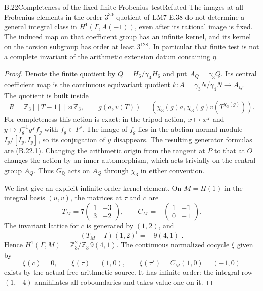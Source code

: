 \begin{statement}{B.22}{Completeness of the fixed finite Frobenius test}{Refuted}
The images at all Frobenius elements in the order-$3^{30}$
quotient of LM7 E.38 do not determine a general integral
class in $H^1(\Gamma,A(-1))$, even after its rational image
is fixed. The induced map on that coefficient group has
an infinite kernel, and its kernel on the torsion subgroup
has order at least $3^{128}$. In particular that finite
test is not a complete invariant of the arithmetic
extension datum containing $\eta$.
\end{statement}
\begin{proof}
Denote the finite quotient by $Q=H_6/\gamma_4H_6$ and put
$A_Q=\gamma_3Q$. Its central coefficient map is the
continuous equivariant quotient
$k:A=\gamma_3N/\gamma_4N\to A_Q$. The quotient is built
inside
\[
 R=\mathbb Z_3[[T-1]]\rtimes\mathbb Z_3,\qquad
 g(a,v(T))=(\chi_3(g)a,\chi_3(g)v(T^{\chi_3(g)})).
                                                               \tag{B.22.1}
\]
For completeness this action is exact: in the tripod
action, $x\mapsto x^\chi$ and
$y\mapsto f_g^{-1}y^\chi f_g$ with $f_g\in F'$.
The image of $f_g$ lies in the abelian normal module
$I_y/[I_y,I_y]$, so its conjugation of $y$ disappears.
The resulting generator formulas are (B.22.1).
Changing the arithmetic origin from the tangent at $P$
to that at $O$ changes the action by an inner automorphism,
which acts trivially on the central group $A_Q$.
Thus $G_{\mathbb Q}$ acts on $A_Q$ through $\chi_3$
in either convention.

We first give an explicit infinite-order kernel element.
On $M=H(1)$ in the integral basis $(u,v)$, the matrices
at $\tau$ and $c$ are
\[
 T_M=7\begin{pmatrix}1&-3\\3&-2\end{pmatrix},
 \qquad
 C_M=-\begin{pmatrix}1&-1\\0&-1\end{pmatrix}.
\]
The invariant lattice for $c$ is generated by $(1,2)$,
and
\[
 (T_M-I)(1,2)^{\mathsf t}=-9(4,1)^{\mathsf t}.
\]
Hence
$H^1(\Gamma,M)=\mathbb Z_3^2/\mathbb Z_3\,9(4,1)$.
The continuous normalized cocycle $\xi$ given by
\[
 \xi(c)=0,\qquad \xi(\tau)=(1,0),\qquad
 \xi(\tau')=C_M(1,0)=(-1,0)
\]
exists by the actual free arithmetic source. It has
infinite order: the integral row $(1,-4)$ annihilates
all coboundaries and takes value one on it.


\end{proof}
